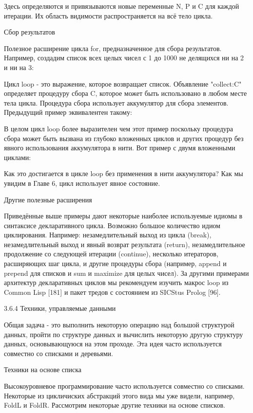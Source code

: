 Здесь определяются и привязываются новые переменные N, P и C для каждой итерации. Их область видимости распространяется на всё тело цикла.

Сбор результатов

Полезное расширение цикла for, предназначенное для сбора результатов. Например, создадим список всех целых чисел с 1 до 1000 не делящихся ни на 2 и ни на 3:

Цикл loop - это выражение, которое возвращает список. Объявление "collect:C" определяет процедуру сбора C, которое может быть использовано в любом месте тела цикла. Процедура сбора использует аккумулятор для сбора элементов. Предыдущий пример эквивалентен такому:

В целом цикл loop более выразителен чем этот пример поскольку процедура сбора может быть вызвана из глубоко вложенных циклов и других процедур без явного использования аккумулятора в нити. Вот пример с двумя вложенными циклами:

Как это достигается в цикле loop без применения в нити аккумулятора? Как мы увидим в Главе 6, цикл использует явное состояние.

Другие полезные расширения

Приведённые выше примеры дают некоторые наиболее используемые идиомы в синтаксисе декларативного цикла. Возможно большое количество идиом циклирования. Например: незамедлительный выход из цикла (break), незамедлительный выход и явный возврат результата (return), незамедлительное продолжение со следующей итерации (continue), несколько итераторов, расширяющих шаг цикла, и другие процедуры сбора (например, append и prepend для списков и sum и maximize для целых чисел). За другими примерами архитектур декларативных циклов мы рекомендуем изучить макрос loop из Common Lisp [181] и пакет тредов с состоянием из SICStus Prolog [96].

3.6.4 Техники, управляемые данными

Общая задача - это выполнить некоторую операцию над большой структурой данных, пройти по структуре данных и вычислить некоторую другую структуру данных, основывающуюся на этом проходе. Эта идея часто используется совместно со списками и деревьями.

Техники на основе списка

Высокоуровневое программирование часто используется совместно со списками. Некоторые из цикличиских абстракций этого вида мы уже видели, например, FoldL и FoldR. Рассмотрим некоторые другие техники на основе списков.

